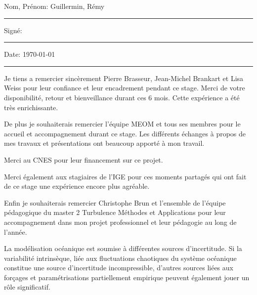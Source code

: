 \documentclass[
11pt, %
oneside, %
french, %
onehalfspacing, %
liststotoc, %
headsepline, %
chapterinoneline, %
]{MastersDoctoralThesis} %
\begin{document}
\noindent Nom, Prénom: Guillermin, Rémy \\
\rule[0.5em]{25em}{0.5pt} %
 
\noindent Signé:\\
\rule[0.5em]{25em}{0.5pt} %
 
\noindent Date: \today \\
\rule[0.5em]{25em}{0.5pt} %

\clearpage



\begin{acknowledgements} %

Je tiens a remercier sincèrement Pierre Brasseur, Jean-Michel Brankart et Lisa Weiss pour leur confiance et leur encadrement pendant ce stage. Merci de votre disponibilité, retour et bienveillance durant ces 6 mois. Cette expérience a été très enrichissante.

De plus je souhaiterais remercier l'équipe MEOM et tous ses membres pour le accueil et accompagnement durant ce stage. Les différents échanges à propos de mes travaux et présentations ont beaucoup apporté à mon travail.

Merci au CNES pour leur financement sur ce projet.

Merci également aux stagiaires de l'IGE pour ces moments partagés qui ont fait de ce stage une expérience encore plus agréable.

Enfin je souhaiterais remercier Christophe Brun et l'ensemble de l'équipe pédagogique du master 2 Turbulence Méthodes et Applications pour leur accompagnement dans mon projet professionnel et leur pédagogie au long de l'année.

\end{acknowledgements}


\begin{center}{\huge\textit{\abstractname}\par}\end{center}

La modélisation océanique est soumise à différentes sources d'incertitude. Si la variabilité intrinsèque, liée aux fluctuations chaotiques du système océanique constitue une source d'incertitude incompressible, d'autres sources liées aux forçages et paramétrisations partiellement empirique peuvent également jouer un rôle significatif. 
\end{document}
